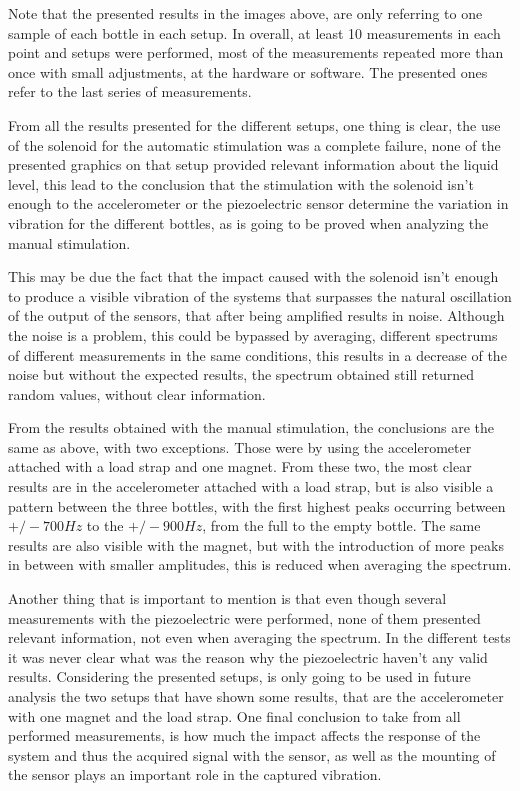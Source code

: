 Note that the presented results in the images above, are only referring to one sample of each bottle in each setup. In overall, at least 10 measurements in each point and setups were performed, most of the measurements repeated more than once with small adjustments, at the hardware or software. The presented ones refer to the last series of measurements. %

From all the results presented for the different setups, one thing is clear, the use of the solenoid for the automatic stimulation was a complete failure, none of the presented graphics on that setup provided relevant information about the liquid level, this lead to the conclusion that the stimulation with the solenoid isn't enough to the accelerometer or the piezoelectric sensor determine the variation in vibration for the different bottles, as is going to be proved when analyzing the manual stimulation. 

This may be due the fact that the impact caused with the solenoid isn't enough to produce a visible vibration of the systems that surpasses the natural oscillation of the output of the sensors, that after being amplified results in noise. Although the noise is a problem, this could be bypassed by averaging, different spectrums of different measurements in the same conditions, this results in a decrease of the noise but without the expected results, the spectrum obtained still returned random values, without clear information.

From the results obtained with the manual stimulation, the conclusions are the same as above, with two exceptions. Those were by using the accelerometer attached with a load strap and one magnet. From these two, the most clear results are in the accelerometer attached with a load strap, but is also visible a pattern between the three bottles, with the first highest peaks occurring between $+/- 700Hz$ to the $+/-900Hz$, from the full to the empty bottle. The same results are also visible with the magnet, but with the introduction of more peaks in between with smaller amplitudes, this is reduced when averaging the spectrum.

Another thing that is important to mention is that even though several measurements with the piezoelectric were performed, none of them presented relevant information, not even when averaging the spectrum. In the different tests it was never clear what was the reason why the piezoelectric haven't any valid results. 
Considering the presented setups, is only going to be used in future analysis the two setups that have shown some results, that are the accelerometer with one magnet and the load strap. One final conclusion to take from all performed measurements, is how much the impact affects the response of the system and thus the acquired signal with the sensor, as well as the mounting of the sensor plays an important role in the captured vibration.
